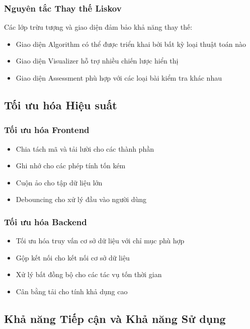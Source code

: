 \subsubsection{Nguyên tắc Thay thế Liskov}
Các lớp trừu tượng và giao diện đảm bảo khả năng thay thế:
\begin{itemize}
    \item Giao diện Algorithm có thể được triển khai bởi bất kỳ loại thuật toán nào
    \item Giao diện Visualizer hỗ trợ nhiều chiến lược hiển thị
    \item Giao diện Assessment phù hợp với các loại bài kiểm tra khác nhau
\end{itemize}

\subsection{Tối ưu hóa Hiệu suất}

\subsubsection{Tối ưu hóa Frontend}
\begin{itemize}
    \item Chia tách mã và tải lười cho các thành phần
    \item Ghi nhớ cho các phép tính tốn kém
    \item Cuộn ảo cho tập dữ liệu lớn
    \item Debouncing cho xử lý đầu vào người dùng
\end{itemize}

\subsubsection{Tối ưu hóa Backend}
\begin{itemize}
    \item Tối ưu hóa truy vấn cơ sở dữ liệu với chỉ mục phù hợp
    \item Gộp kết nối cho kết nối cơ sở dữ liệu
    \item Xử lý bất đồng bộ cho các tác vụ tốn thời gian
    \item Cân bằng tải cho tính khả dụng cao
\end{itemize}

\subsection{Khả năng Tiếp cận và Khả năng Sử dụng}


